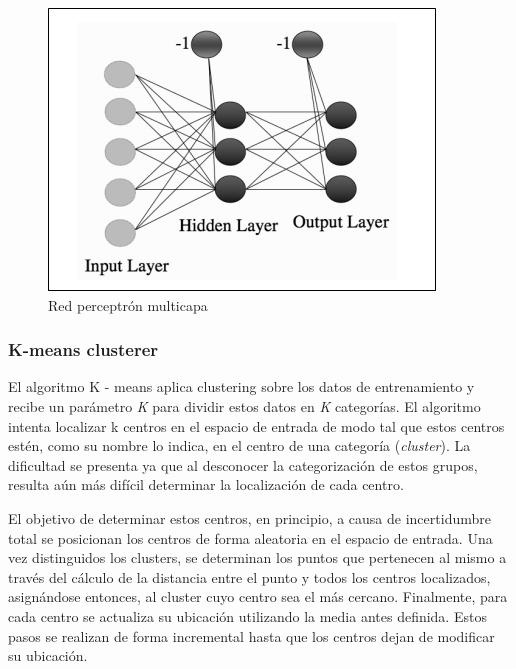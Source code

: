 \begin{figure}
\begin{centering}
\includegraphics[scale=0.85]{images/Perceptron-multilayer}
\par\end{centering}

\caption{Red perceptrón multicapa\label{fig:perceptron-neural-network-multilayer}}
\end{figure}



\subsubsection{K-means clusterer}

El algoritmo K - means aplica clustering sobre los datos de entrenamiento
y recibe un parámetro \emph{K} para dividir estos datos en \emph{K}
categorías. El algoritmo intenta localizar k centros en el espacio
de entrada de modo tal que estos centros estén, como su nombre lo
indica, en el centro de una categoría (\emph{cluster}). La dificultad
se presenta ya que al desconocer la categorización de estos grupos,
resulta aún más difícil determinar la localización de cada centro. 

El objetivo de determinar estos centros, en principio, a causa de
incertidumbre total se posicionan los centros de forma aleatoria en
el espacio de entrada. Una vez distinguidos los clusters, se determinan
los puntos que pertenecen al mismo a través del cálculo de la distancia
entre el punto y todos los centros localizados, asignándose entonces,
al cluster cuyo centro sea el más cercano. Finalmente, para cada centro
se actualiza su ubicación utilizando la media antes definida. Estos
pasos se realizan de forma incremental hasta que los centros dejan
de modificar su ubicación. 

